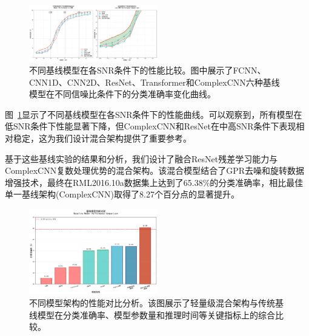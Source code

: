 \documentclass[conference]{IEEEtran}
\begin{document}
\begin{figure}[htbp]
\centering
\includegraphics[width=0.5\textwidth]{figure/snr_performance_comparison.pdf}
\caption{不同基线模型在各SNR条件下的性能比较。图中展示了FCNN、CNN1D、CNN2D、ResNet、Transformer和ComplexCNN六种基线模型在不同信噪比条件下的分类准确率变化曲线。}
\label{fig:snr_performance}
\end{figure}


图~\ref{fig:snr_performance}显示了不同基线模型在各SNR条件下的性能曲线。可以观察到，所有模型在低SNR条件下性能显著下降，但ComplexCNN和ResNet在中高SNR条件下表现相对稳定，这为我们设计混合架构提供了重要参考。

基于这些基线实验的结果和分析，我们设计了融合ResNet残差学习能力与ComplexCNN复数处理优势的混合架构。该混合模型结合了GPR去噪和旋转数据增强技术，最终在RML2016.10a数据集上达到了65.38\%的分类准确率，相比最佳单一基线架构(ComplexCNN)取得了8.27个百分点的显著提升。

\begin{figure}[htbp]
\centering
\includegraphics[width=0.5\textwidth]{figure/baseline_model_comparison.pdf}
\caption{不同模型架构的性能对比分析。该图展示了轻量级混合架构与传统基线模型在分类准确率、模型参数量和推理时间等关键指标上的综合比较。}
\label{fig:model_comparison}
\end{figure}
\end{document}
